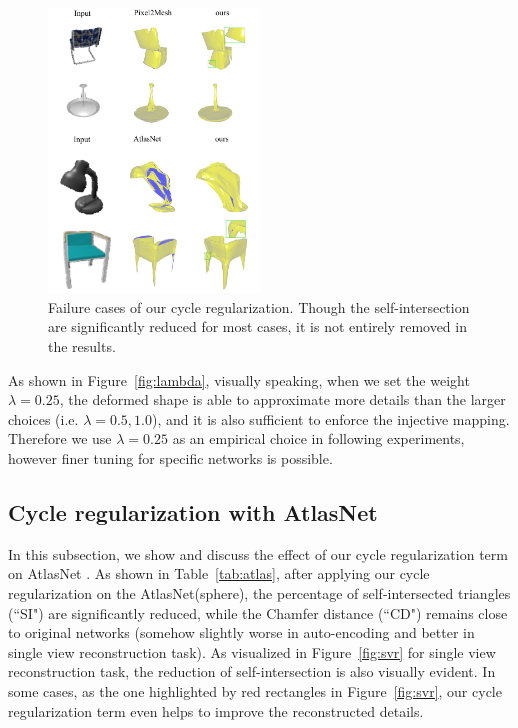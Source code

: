 \begin{figure}
	\begin{center}
		\includegraphics[width=0.5\textwidth]{img/limit/limit}
	\end{center}
	\caption{Failure cases of our cycle regularization. Though the self-intersection are significantly reduced for most cases, it is not entirely removed in the results.}
	\label{fig:limit}
\end{figure}

As shown in Figure~\ref{fig:lambda}, visually speaking, when we set the weight $\lambda=0.25$, the deformed shape is able to approximate more details than the larger choices (i.e. $\lambda=0.5,1.0$), and it is also sufficient to enforce the injective mapping.  Therefore we use $\lambda=0.25$ as an empirical choice in following experiments, however finer tuning for specific networks is possible. 

\subsection{Cycle regularization with AtlasNet}
In this subsection, we show and discuss the effect of our cycle regularization term on AtlasNet \cite{atlasnet}. As shown in Table~\ref{tab:atlas}, after applying our cycle regularization on the AtlasNet(sphere), the percentage of self-intersected triangles (``SI") are significantly reduced, while the Chamfer distance (``CD") remains close to original networks (somehow slightly worse in auto-encoding and better in single view reconstruction task). As visualized in Figure~\ref{fig:svr} for single view reconstruction task, the reduction of self-intersection is also visually evident. In some cases, as the one highlighted by red rectangles in Figure~\ref{fig:svr}, our cycle regularization term even helps to improve the reconstructed details.

